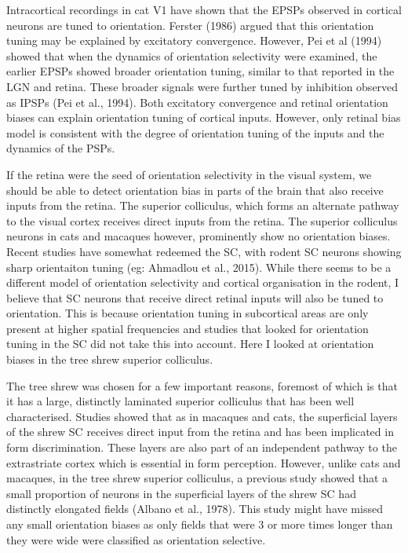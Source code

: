 	 Intracortical recordings in cat V1 have shown that the EPSPs observed in cortical neurons are tuned to orientation. Ferster (1986) argued that this orientation tuning may be explained by excitatory convergence. However, Pei et al (1994) showed that when the dynamics of orientation selectivity were examined, the earlier EPSPs showed broader orientation tuning, similar to that reported in the LGN and retina. These broader signals were further tuned by inhibition observed as IPSPs (Pei et al., 1994). Both excitatory convergence and retinal orientation biases can explain orientation tuning of cortical inputs. However, only retinal bias model is consistent with the degree of orientation tuning of the inputs and the dynamics of the PSPs.
	 
 
	If the retina were the seed of orientation selectivity in the visual system, we should be able to detect orientation bias in parts of the brain that also receive inputs from the retina. The superior colliculus, which forms an alternate pathway to the visual cortex receives direct inputs from the retina. The superior colliculus neurons in cats and macaques however, prominently show no orientation biases. Recent studies have somewhat redeemed the SC, with rodent SC neurons showing sharp orientaiton tuning (eg: Ahmadlou et al., 2015). While there seems to be a different model of orientation selectivity and cortical organisation in the rodent, I believe that SC neurons that receive direct retinal inputs will also be tuned to orientation. This is because orientation tuning in subcortical areas are only present at higher spatial frequencies and studies that looked for orientation tuning in the SC did not take this into account. Here I looked at orientation biases in the tree shrew superior colliculus.
	
	The tree shrew was chosen for a few important reasons, foremost of which is that it has a large, distinctly laminated superior colliculus that has been well characterised. Studies showed that as in macaques and cats, the superficial layers of the shrew SC receives direct input from the retina and has been implicated in form discrimination. These layers are also part of an independent pathway to the extrastriate cortex which is essential in form perception. However, unlike cats and macaques, in the tree shrew superior colliculus, a previous study showed that a small proportion of neurons in the superficial layers of the shrew SC had distinctly elongated fields (Albano et al., 1978). This study might have missed any small orientation biases as only fields that were 3 or more times longer than they were wide were classified as orientation selective.
	
